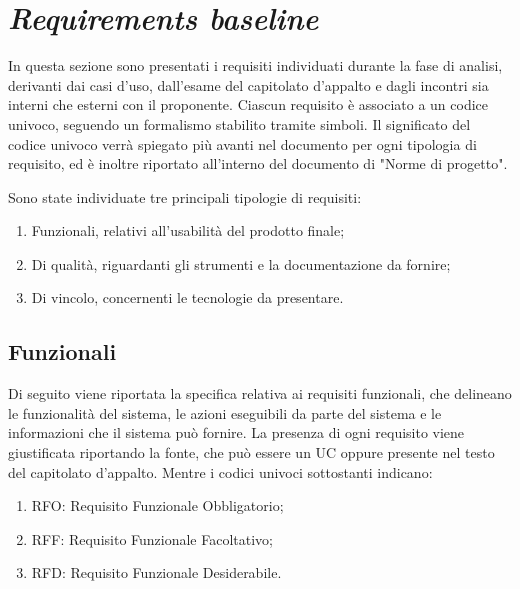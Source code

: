 \section{\textit{Requirements baseline}}

In questa sezione sono presentati i requisiti individuati durante la fase di analisi, derivanti dai casi d'uso, dall'esame del capitolato d'appalto e dagli incontri
sia interni che esterni con il proponente. Ciascun requisito è associato a un codice univoco, seguendo un formalismo stabilito tramite simboli.
Il significato del codice univoco verrà spiegato più avanti nel documento per ogni tipologia di requisito, ed è inoltre riportato all'interno del documento di "Norme di progetto".

Sono state individuate tre principali tipologie di requisiti:
\begin{enumerate}
	\item Funzionali, relativi all'usabilità del prodotto finale;
	\item Di qualità, riguardanti gli strumenti e la documentazione da fornire;
	\item Di vincolo, concernenti le tecnologie da presentare.
\end{enumerate}

\subsection{Funzionali}

Di seguito viene riportata la specifica relativa ai requisiti funzionali, che delineano le funzionalità del sistema, le azioni eseguibili
da parte del sistema e le informazioni che il sistema può fornire. La presenza di ogni requisito viene giustificata riportando la fonte, che può essere un UC oppure presente
nel testo del capitolato d'appalto. Mentre i codici univoci sottostanti indicano:
\begin{enumerate}
	\item RFO: Requisito Funzionale Obbligatorio;
	\item RFF: Requisito Funzionale Facoltativo;
	\item RFD: Requisito Funzionale Desiderabile.
\end{enumerate}



